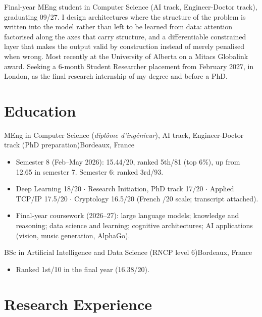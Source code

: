 \cvheader

{\small Final-year MEng student in Computer Science (AI track, Engineer-Doctor track), graduating 09/27.
I design architectures where the structure of the problem is written into the model rather than left to be
learned from data: attention factorised along the axes that carry structure, and a differentiable constrained
layer that makes the output valid by construction instead of merely penalised when wrong. Most recently at
the University of Alberta on a Mitacs Globalink award. Seeking a 6-month Student Researcher placement from
February 2027, in London, as the final research internship of my degree and before a PhD.}

\section{Education}

%
{MEng in Computer Science (\textit{diplôme d'ingénieur}), AI track, Engineer-Doctor track (PhD preparation)}{Bordeaux, France}
\begin{itemize}
    \item Semester 8 (Feb--May 2026): 15.44/20, ranked 5th/81 (top 6\%), up from 12.65 in semester 7. Semester 6: ranked 3rd/93.
    \item Deep Learning 18/20 $\cdot$ Research Initiation, PhD track 17/20 $\cdot$ Applied TCP/IP 17.5/20 $\cdot$ Cryptology 16.5/20 (French /20 scale; transcript attached).
    \item Final-year coursework (2026--27): large language models; knowledge and reasoning; data science and learning; cognitive architectures; AI applications (vision, music generation, AlphaGo).
\end{itemize}

\entrygap

%
{BSc in Artificial Intelligence and Data Science (RNCP level 6)}{Bordeaux, France}
\begin{itemize}
    \item Ranked 1st/10 in the final year (16.38/20).
\end{itemize}

\section{Research Experience}

